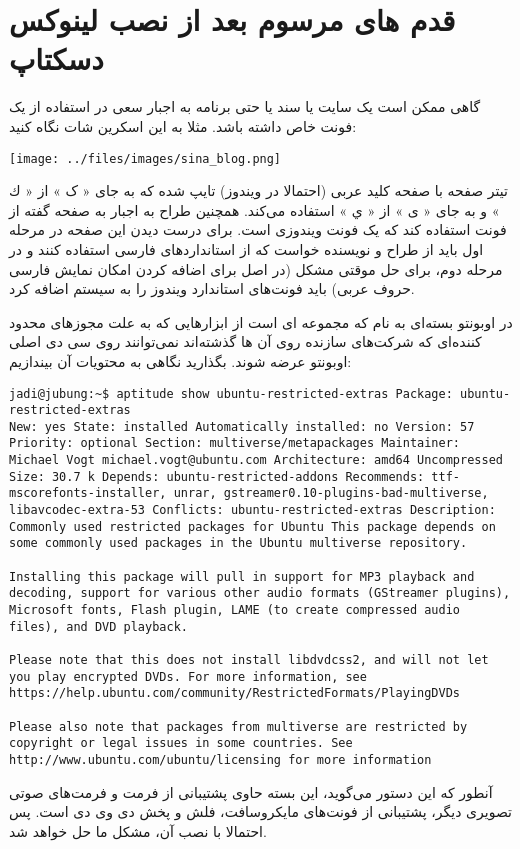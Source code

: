 \section{قدم های مرسوم بعد از نصب لینوکس دسکتاپ}
گاهی ممکن است یک سایت یا سند یا حتی برنامه به اجبار سعی در استفاده از یک فونت خاص داشته باشد. مثلا به این اسکرین شات نگاه کنید:

\texttt{[image: ../files/images/sina\_blog.png]}

تیتر صفحه با صفحه کلید عربی (احتمالا در ویندوز) تایپ شده که به جای «
{ک}
» از «
{ك}
»  و به جای «
{ی}
» از «
{ي}
» استفاده می‌کند. 
همچنین طراح به اجبار به صفحه گفته از فونت 
 استفاده کند که یک فونت ویندوزی است. برای درست دیدن این صفحه در مرحله اول باید از طراح و نویسنده خواست که از استانداردهای فارسی استفاده کنند و در مرحله دوم،‌ برای حل موقتی مشکل (در اصل برای اضافه کردن امکان نمایش فارسی حروف عربی) باید فونت‌های استاندارد ویندوز را به سیستم اضافه کرد.

در اوبونتو بسته‌ای به نام 
 که مجموعه ای است از ابزارهایی که به علت مجوزهای محدود کننده‌ای که شرکت‌های سازنده روی آن ها گذشته‌اند نمی‌توانند روی سی دی اصلی اوبونتو عرضه شوند. بگذارید نگاهی به محتویات آن بیندازیم:
\begin{frameng}
\begin{lstlisting}
jadi@jubung:~$ aptitude show ubuntu-restricted-extras Package: ubuntu-restricted-extras
New: yes State: installed Automatically installed: no Version: 57 Priority: optional Section: multiverse/metapackages Maintainer: Michael Vogt michael.vogt@ubuntu.com Architecture: amd64 Uncompressed Size: 30.7 k Depends: ubuntu-restricted-addons Recommends: ttf-mscorefonts-installer, unrar, gstreamer0.10-plugins-bad-multiverse, libavcodec-extra-53 Conflicts: ubuntu-restricted-extras Description: Commonly used restricted packages for Ubuntu This package depends on some commonly used packages in the Ubuntu multiverse repository.

Installing this package will pull in support for MP3 playback and decoding, support for various other audio formats (GStreamer plugins), Microsoft fonts, Flash plugin, LAME (to create compressed audio files), and DVD playback.

Please note that this does not install libdvdcss2, and will not let you play encrypted DVDs. For more information, see https://help.ubuntu.com/community/RestrictedFormats/PlayingDVDs

Please also note that packages from multiverse are restricted by copyright or legal issues in some countries. See http://www.ubuntu.com/ubuntu/licensing for more information
\end{lstlisting}
\end{frameng}
آنطور که این دستور می‌گوید، این بسته حاوی پشتیبانی از فرمت 
 و فرمت‌های صوتی تصویری دیگر، پشتیبانی از فونت‌های مایکروسافت، فلش و پخش دی وی دی است. پس احتمالا با نصب آن، مشکل ما حل خواهد شد.

